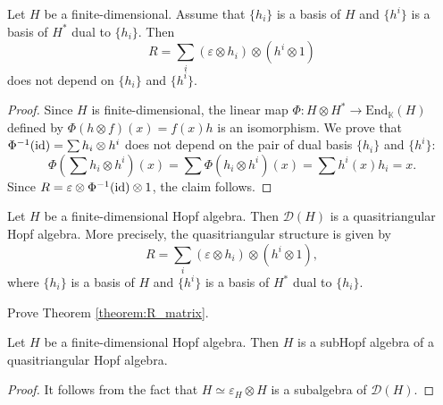 \begin{lemma}
Let $H$ be a finite-dimensional.
Assume that $\{h_{i}\}$ is a basis of $H$ and $\{h^{i}\}$ is a basis
of $H^{*}$ dual to $\{h_{i}\}$. Then 
\begin{equation}
	R=\sum_{i}(\varepsilon\otimes h_{i})\otimes(h^{i}\otimes1)
\end{equation}
does not depend on $\{h_i\}$ and $\{h^i\}$.
\end{lemma}

\begin{proof}
Since $H$ is finite-dimensional, the linear map $\Phi:H\otimes
H^{*}\to\mathrm{End}_{\mathbb{K}}(H)$ defined by $\Phi(h\otimes f)(x)=f(x)h$ is
an isomorphism. We prove that $\Phi^{-1}(\mathrm{id})=\sum h_{i}\otimes h^{i}$
does not depend on the pair of dual basis $\{h_{i}\}$ and $\{h^{i}\}$:
\[
\Phi(\sum h_{i}\otimes h^{i})(x)=\sum\Phi(h_{i}\otimes h^{i})(x)=\sum h^{i}(x)h_{i}=x.
\]
Since $R=\varepsilon\otimes\Phi^{-1}(\mathrm{id})\otimes1$, the claim
follows. 
\end{proof}

\begin{theorem}
\label{theorem:R_matrix}
Let $H$ be a finite-dimensional Hopf algebra. Then $\mathcal{D}(H)$ is a
quasitriangular Hopf algebra. More precisely, the quasitriangular structure is
given by 
\begin{equation}
R=\sum_{i}(\varepsilon\otimes h_{i})\otimes(h^{i}\otimes1),\label{eq:R}
\end{equation}
where $\{h_{i}\}$ is a basis of $H$ and $\{h^{i}\}$ is a basis
of $H^{*}$ dual to $\{h_{i}\}$. 
\end{theorem}

\begin{exercise}
Prove Theorem \ref{theorem:R_matrix}.
\end{exercise}

\begin{corollary}
Let $H$ be a finite-dimensional Hopf algebra. Then $H$ is a subHopf algebra of
a quasitriangular Hopf algebra. 
\end{corollary}

\begin{proof}
It follows from the fact that $H\simeq\varepsilon_{H}\otimes H$ is a subalgebra
of $\mathcal{D}(H)$. 
\end{proof}

